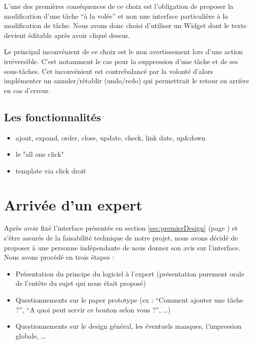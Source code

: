 \documentclass[11pt]{article}
\begin{document}
L'une des premières conséquences de ce choix est l'obligation de
proposer la modification d'une tâche ``à la volée'' et non une
interface particulière à la modification de tâche. Nous avons donc
choisi d'utiliser un Widget dont le texte devient éditable après avoir
cliqué dessus.

Le principal inconvénient de ce choix est le non avertissement lors
d'une action irréversible. C'est notamment le cas pour la suppression
d'une tâche et de ses sous-tâches. Cet inconvénient est contrebalancé
par la volonté d'alors implémenter un annuler/rétablir (undo/redo) qui
permettrait le retour en arrière en cas d'erreur.



\subsection{Les fonctionnalités}
\begin{itemize}
\item ajout, expand, order, close, update, check, link date, up\&down
\item le "all one click"
\item template via click droit
\end{itemize}



\section{Arrivée d'un expert}

Après avoir fixé l'interface présentée en section
\ref{sec:premierDesign} (page \pageref{sec:premierDesign}) et s'être
assurés de la faisabilité technique de notre projet, nous avons décidé
de proposer à une personne indépendante de nous donner son avis sur
l'interface. Nous avons procédé en trois étapes :

\begin{itemize}
\item Présentation du principe du logiciel à l'expert (présentation
  purement orale de l'entête du sujet qui nous était proposé)
\item Questionnements sur le paper prototype (ex : ``Comment ajouter
  une tâche ?'', ``A quoi peut servir ce bouton selon vous ?'', \dots)
\item Questionnements sur le design général, les éventuels manques,
  l'impression globale, \dots
\end{itemize}
\end{document}
